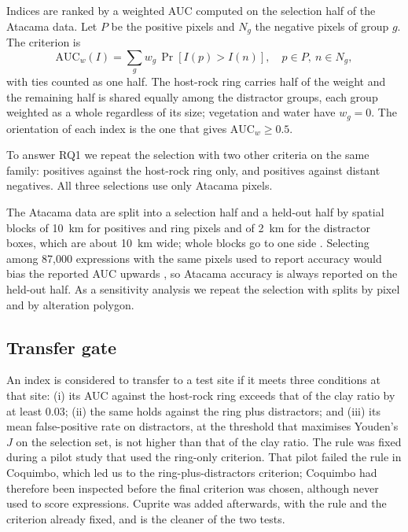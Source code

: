 \documentclass[preprint,authoryear,number]{elsarticle}
\begin{document}
Indices are ranked by a weighted AUC computed on the selection half of the Atacama data. Let $P$ be the positive pixels and $N_g$ the negative pixels of group $g$. The criterion is
\begin{equation}
\mathrm{AUC}_w(I) = \sum_g w_g \, \Pr\left[I(p) > I(n)\right], \quad p \in P,\ n \in N_g,
\label{eq:wauc}
\end{equation}
with ties counted as one half. The host-rock ring carries half of the weight and the remaining half is shared equally among the distractor groups, each group weighted as a whole regardless of its size; vegetation and water have $w_g = 0$. The orientation of each index is the one that gives $\mathrm{AUC}_w \ge 0.5$.

To answer RQ1 we repeat the selection with two other criteria on the same family: positives against the host-rock ring only, and positives against distant negatives. All three selections use only Atacama pixels.

The Atacama data are split into a selection half and a held-out half by spatial blocks of \SI{10}{\kilo\meter} for positives and ring pixels and of \SI{2}{\kilo\meter} for the distractor boxes, which are about \SI{10}{\kilo\meter} wide; whole blocks go to one side \citep{Roberts2017,Meyer2022}. Selecting among 87{,}000 expressions with the same pixels used to report accuracy would bias the reported AUC upwards \citep{Ambroise2002}, so Atacama accuracy is always reported on the held-out half. As a sensitivity analysis we repeat the selection with splits by pixel and by alteration polygon.

\subsection{Transfer gate}
\label{sec:gate}

An index is considered to transfer to a test site if it meets three conditions at that site: (i) its AUC against the host-rock ring exceeds that of the clay ratio by at least 0.03; (ii) the same holds against the ring plus distractors; and (iii) its mean false-positive rate on distractors, at the threshold that maximises Youden's $J$ on the selection set, is not higher than that of the clay ratio. The rule was fixed during a pilot study that used the ring-only criterion. That pilot failed the rule in Coquimbo, which led us to the ring-plus-distractors criterion; Coquimbo had therefore been inspected before the final criterion was chosen, although never used to score expressions. Cuprite was added afterwards, with the rule and the criterion already fixed, and is the cleaner of the two tests.
\end{document}
